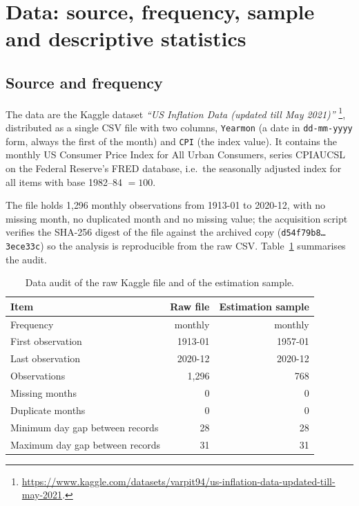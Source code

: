 \section{Data: source, frequency, sample and descriptive statistics}
\label{sec:data}

\subsection{Source and frequency}

The data are the Kaggle dataset
\emph{``US Inflation Data (updated till May 2021)''}%
\footnote{\url{https://www.kaggle.com/datasets/varpit94/us-inflation-data-updated-till-may-2021}.},
distributed as a single CSV file with two columns, \texttt{Yearmon} (a date in
\texttt{dd-mm-yyyy} form, always the first of the month) and \texttt{CPI} (the
index value). It contains the monthly US Consumer Price Index for All Urban
Consumers, series CPIAUCSL on the Federal Reserve's FRED database, i.e.\ the
seasonally adjusted index for all items with base 1982--84 $=100$.

The file holds 1{,}296 monthly observations from 1913-01 to 2020-12, with no
missing month, no duplicated month and no missing value; the acquisition script
verifies the SHA-256 digest of the file against the archived copy
(\texttt{d54f79b8\dots3ece33c}) so the analysis is reproducible from the raw CSV.
Table~\ref{tab:dataaudit} summarises the audit.

\begin{table}[htbp]
\centering
\small
\caption{Data audit of the raw Kaggle file and of the estimation sample.}
\label{tab:dataaudit}
\begin{tabular}{lrr}
\toprule
Item & Raw file & Estimation sample \\
\midrule
Frequency & monthly & monthly \\
First observation & 1913-01 & 1957-01 \\
Last observation & 2020-12 & 2020-12 \\
Observations & 1{,}296 & 768 \\
Missing months & 0 & 0 \\
Duplicate months & 0 & 0 \\
Minimum day gap between records & 28 & 28 \\
Maximum day gap between records & 31 & 31 \\
\bottomrule
\end{tabular}
\end{table}

